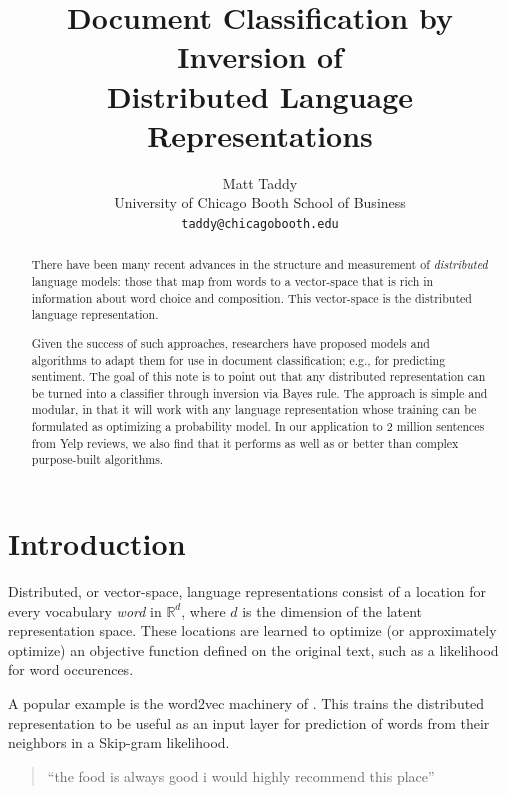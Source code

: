 \documentclass[11pt]{article}
\title{Document Classification by Inversion of \\Distributed Language Representations}
\author{Matt Taddy \\
  University of Chicago Booth School of Business \\
  {\tt taddy@chicagobooth.edu} \\}
\date{}
\begin{document}
\maketitle
\begin{abstract}
There have been many recent advances in the structure and measurement of {\it distributed} language models: those that map from words to a vector-space that is rich in information about word choice and composition.  This vector-space is the distributed language representation.    

Given the success of such approaches,  researchers have proposed
models and algorithms to adapt them for use in document classification; e.g., for predicting sentiment.  The goal of this note is to point out that any distributed  representation can be turned into a classifier through inversion via Bayes rule.  
The approach is simple and modular, in that it will work with any language representation whose training can be formulated as optimizing a probability model. In our application to 2 million sentences from Yelp reviews, we also find that it performs as well as or better than  complex purpose-built algorithms. \end{abstract}

\section{Introduction}

Distributed, or vector-space, language representations consist of a location
for every vocabulary {\it word} in $\mathds{R}^d$, where $d$ is the dimension
of the latent representation space.  These locations are learned to optimize (or approximately optimize) an objective function defined on the original text, such as
a likelihood for word occurences.

A popular example is the word2vec machinery of .  This 
trains the distributed representation to be useful as an input layer for prediction of
words from their neighbors in a Skip-gram likelihood.


\begin{quote}
``the food is always good i would highly recommend this place''
\end{quote}
\end{document}
